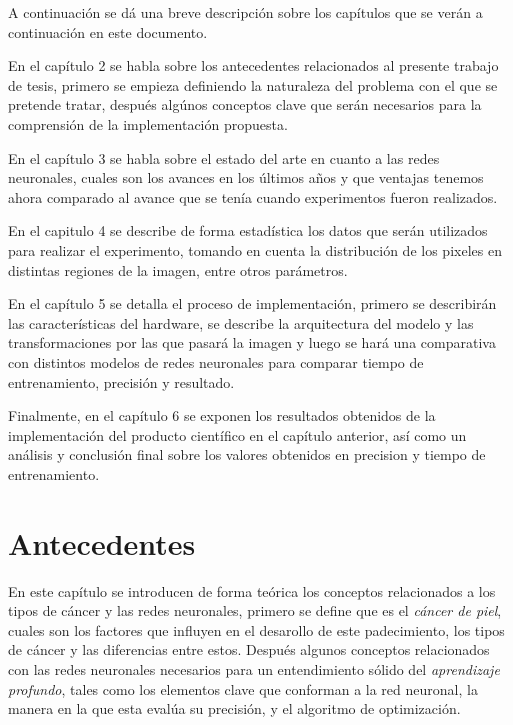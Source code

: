 A continuación se dá una breve descripción sobre los capítulos que se verán a continuación en este documento.

En el capítulo 2 se habla sobre los antecedentes relacionados al presente trabajo de tesis, primero se empieza definiendo la naturaleza del problema con el que se pretende tratar, después algúnos conceptos clave que serán necesarios para la comprensión de la implementación propuesta. 

En el capítulo 3 se habla sobre el estado del arte en cuanto a las redes neuronales, cuales son los avances en los últimos años y que ventajas tenemos ahora comparado al avance que se tenía cuando experimentos fueron realizados.

En el capitulo 4 se describe de forma estadística los datos que serán utilizados para realizar el experimento, tomando en cuenta la distribución de los pixeles en distintas regiones de la imagen, entre otros parámetros. 

En el capítulo 5 se detalla el proceso de implementación, primero se describirán las características del hardware, se describe la arquitectura del modelo y las transformaciones por las que pasará la imagen y luego se hará una comparativa con distintos modelos de redes neuronales para comparar tiempo de entrenamiento, precisión y resultado.

Finalmente, en el capítulo 6 se exponen los resultados obtenidos de la implementación del producto científico en el capítulo anterior, así como un análisis y conclusión final sobre los valores obtenidos en precision y tiempo de entrenamiento. 

\chapter{Antecedentes}
En este capítulo se introducen de forma teórica los conceptos relacionados a los tipos de cáncer y las redes neuronales, primero se define que es el \emph{cáncer de piel}, cuales son los factores que influyen en el desarollo de este padecimiento, los tipos de cáncer y las diferencias entre estos. Después algunos conceptos relacionados con las redes neuronales necesarios para un entendimiento sólido del \emph{aprendizaje profundo}, tales como los elementos clave que conforman a la red neuronal, la manera en la que esta evalúa su precisión, y el algoritmo de optimización.

